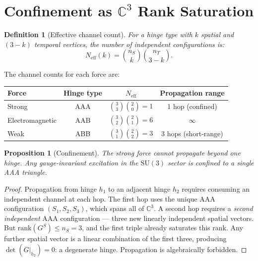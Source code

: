 \documentclass[12pt]{article}
\newtheorem{proposition}[theorem]{Proposition}
\newtheorem{definition}[theorem]{Definition}
\theoremstyle{remark}
\begin{document}
\section{Confinement as $\mathbb{C}^3$ Rank Saturation}
\label{sec:confinement}

\begin{definition}[Effective channel count]
For a hinge type with $k$ spatial and $(3-k)$ temporal vertices, the
number of independent configurations is:
\begin{equation}
N_{\mathrm{eff}}(k) = \binom{n_S}{k} \binom{n_T}{3-k}.
\end{equation}
\end{definition}

\noindent
The channel counts for each force are:

\begin{center}
\begin{tabular}{lccc}
\hline
Force & Hinge type & $N_{\mathrm{eff}}$ & Propagation range \\
\hline
Strong & AAA & $\binom{3}{3}\binom{2}{0} = 1$ & 1 hop (confined) \\
Electromagnetic & AAB & $\binom{3}{2}\binom{2}{1} = 6$ & $\infty$ \\
Weak & ABB & $\binom{3}{1}\binom{2}{2} = 3$ & 3 hops (short-range) \\
\hline
\end{tabular}
\end{center}

\begin{proposition}[Confinement]
\label{prop:confinement}
The strong force cannot propagate beyond one hinge. Any gauge-invariant
excitation in the $\mathrm{SU}(3)$ sector is confined to a single AAA
triangle.
\end{proposition}

\begin{proof}
Propagation from hinge $h_1$ to an adjacent hinge $h_2$ requires
consuming an independent channel at each hop. The first hop uses the
unique AAA configuration $(S_1, S_2, S_3)$, which spans all of
$\mathbb{C}^3$. A second hop requires a \emph{second independent} AAA
configuration --- three new linearly independent spatial vectors. But
$\mathrm{rank}(G^S) \leq n_S = 3$, and the first triple already
saturates this rank. Any further spatial vector is a linear combination
of the first three, producing $\det(G|_{h_2}) = 0$: a degenerate hinge.
Propagation is algebraically forbidden.
\end{proof}
\end{document}

